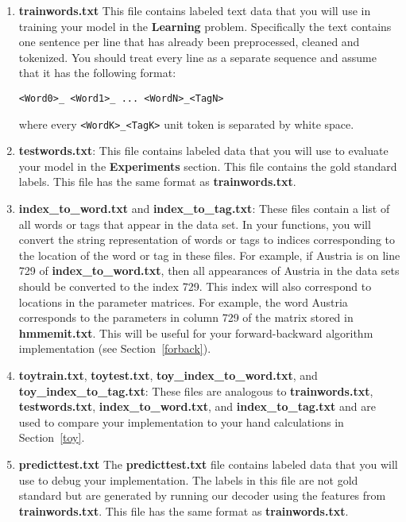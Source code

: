 \documentclass[11pt,addpoints,answers]{exam}
\numberwithin{equation}{section} %
\numberwithin{figure}{section} %
\numberwithin{table}{section} %
\begin{document}
\begin{enumerate}

\item \textbf{trainwords.txt} This file contains labeled text data that you will use in training your model in the \textbf{Learning} problem. Specifically the text contains one sentence per line that has already been preprocessed, cleaned and tokenized. You should treat every line as a separate sequence and assume that it has the following format:

    \texttt{<Word0>\_<Tag0> <Word1>\_<Tag1> ... <WordN>\_<TagN>}

where every \texttt{<WordK>\_<TagK>} unit token is separated by white space.

\item \textbf{testwords.txt}: This file contains labeled data that you will use to evaluate your model in the \textbf{Experiments} section. This file contains the gold standard labels.  This file has the same format as \textbf{trainwords.txt}.
    
\item \textbf{index\_to\_word.txt} and \textbf{index\_to\_tag.txt}: These files contain a list of all words or tags that appear in the data set. In your functions, you will convert the string representation of words or tags to indices corresponding to the location of the word or tag in these files. For example, if Austria is on line 729 of \textbf{index\_to\_word.txt}, then all appearances of Austria in the data sets should be converted to the index 729. This index will also correspond to locations in the parameter matrices. For example, the word Austria corresponds to the parameters in column 729 of the matrix stored in \textbf{hmmemit.txt}. This will be useful for your forward-backward algorithm implementation (see Section~\ref{forback}).
    
\item \textbf{toytrain.txt}, \textbf{toytest.txt}, \textbf{toy\_index\_to\_word.txt}, and \textbf{toy\_index\_to\_tag.txt}: These files are analogous to \textbf{trainwords.txt}, \textbf{testwords.txt}, \textbf{index\_to\_word.txt}, and \textbf{index\_to\_tag.txt} and are used to compare your implementation to your hand calculations in Section~\ref{toy}.

\item \textbf{predicttest.txt} The \textbf{predicttest.txt} file contains labeled data that you will use to debug your implementation. The labels in this file are not gold standard but are generated by running our decoder using the features from \textbf{trainwords.txt}. This file has the same format as \textbf{trainwords.txt}.


\end{enumerate}
\end{document}
